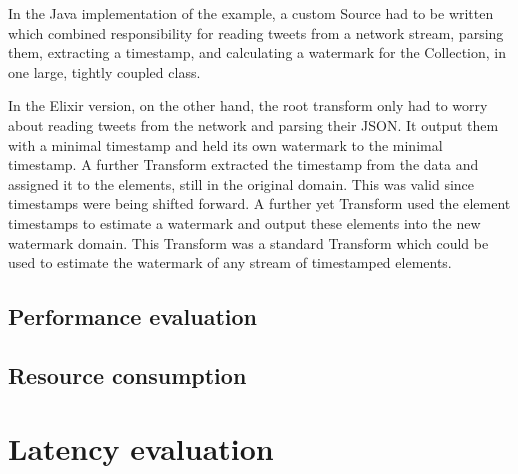 In the Java implementation of the example, a custom Source had to be written which combined responsibility for reading tweets from a network stream, parsing them, extracting a timestamp, and calculating a watermark for the Collection, in one large, tightly coupled class.

In the Elixir version, on the other hand, the root transform only had to worry about reading tweets from the network and parsing their JSON.
It output them with a minimal timestamp and held its own watermark to the minimal timestamp.
A further Transform extracted the timestamp from the data and assigned it to the elements, still in the original domain.
This was valid since timestamps were being shifted forward.
A further yet Transform used the element timestamps to estimate a watermark and output these elements into the new watermark domain.
This Transform was a standard Transform which could be used to estimate the watermark of any stream of timestamped elements.


\subsection{Performance evaluation}

\subsection{Resource consumption}

\section{Latency evaluation}

